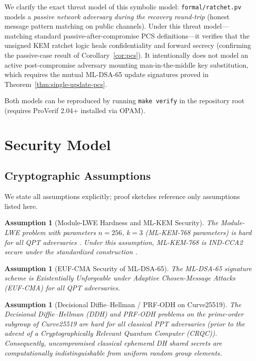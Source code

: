\documentclass[11pt,a4paper]{article}
\theoremstyle{remark}
\theoremstyle{plain}
\newtheorem{assumption}[theorem]{Assumption}
\begin{document}
\begin{enumerate}
\begin{itemize}
        \end{itemize}
        We clarify the exact threat model of this symbolic model: \texttt{formal/ratchet.pv} models a \emph{passive network adversary during the recovery round-trip} (honest message pattern matching on public channels). Under this threat model---matching standard passive-after-compromise PCS definitions---it verifies that the unsigned KEM ratchet logic heals confidentiality and forward secrecy (confirming the passive-case result of Corollary~\ref{cor:pcs}). It intentionally does not model an active post-compromise adversary mounting man-in-the-middle key substitution, which requires the mutual ML-DSA-65 update signatures proved in Theorem~\ref{thm:single-update-pcs}.
\end{enumerate}
Both models can be reproduced by running \texttt{make verify} in the repository root
(requires ProVerif 2.04+ installed via OPAM).

\section{Security Model}
\label{sec:secmodel}

\subsection{Cryptographic Assumptions}
\label{sec:assumptions}

We state all assumptions explicitly; proof sketches reference only assumptions listed here.

\begin{assumption}[Module-LWE Hardness and ML-KEM Security]
\label{asm:mlwe}
The Module-LWE problem with parameters $n = 256$, $k = 3$ (ML-KEM-768 parameters) is hard for
all QPT adversaries \cite{langlois2015mlwe}.  Under this assumption, ML-KEM-768 is
IND-CCA2 secure under the standardized construction \cite{nist_fips203}.
\end{assumption}

\begin{assumption}[EUF-CMA Security of ML-DSA-65]
\label{asm:mldsa}
The ML-DSA-65 signature scheme \cite{nist_fips204} is Existentially Unforgeable under Adaptive
Chosen-Message Attacks (EUF-CMA) for all QPT adversaries.
\end{assumption}

\begin{assumption}[Decisional Diffie--Hellman / PRF-ODH on Curve25519]
\label{asm:cdh}
The Decisional Diffie--Hellman (DDH) and PRF-ODH problems on the prime-order subgroup of Curve25519 are hard for all classical PPT adversaries (prior to the advent of a Cryptographically Relevant Quantum Computer (CRQC)). Consequently, uncompromised classical ephemeral DH shared secrets are computationally indistinguishable from uniform random group elements.
\end{assumption}
\end{document}
